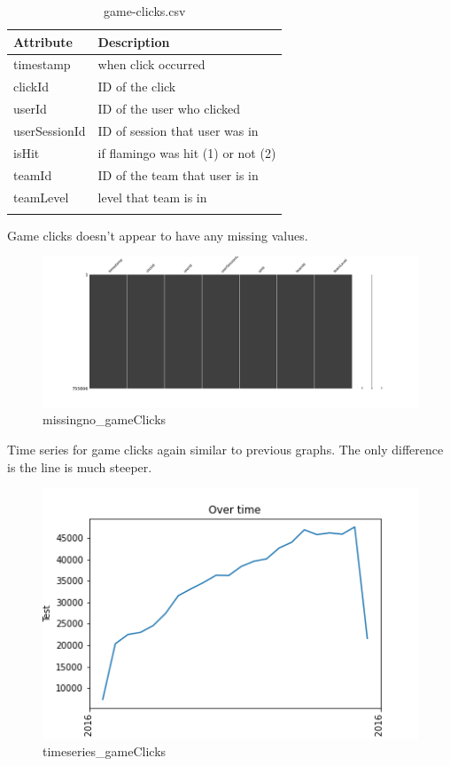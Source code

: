 \begin{center}
\begin{longtable}{ |l|l| } 
 \hline
 Attribute & Description\\ 
 \hline
 timestamp & when click occurred\\ 
 \hline
 clickId & ID of the click\\ 
 \hline
 userId & ID of the user who clicked\\ 
 \hline
 userSessionId & ID of session that user was in\\ 
 \hline
 isHit & if flamingo was hit (1) or not (2)\\ 
 \hline
 teamId & ID of the team that user is in\\ 
 \hline
 teamLevel & level that team is in\\ 
 \hline
\caption{game-clicks.csv}
\end{longtable}
\end{center}

Game clicks doesn't appear to have any missing values.
\begin{figure}[H]
\includegraphics[scale=0.25]{img/Graphs/gameClicks/missingno_gameClicks.png}
\centering
\caption{missingno\_gameClicks}
\label{fig:missingno_gameClicks}
\end{figure}

Time series for game clicks again similar to previous graphs. The only difference is the line is much steeper.
\begin{figure}[H]
\includegraphics[scale=0.85]{img/Graphs/gameClicks/timeseries_gameClicks.png}
\centering
\caption{timeseries\_gameClicks}
\label{fig:timeseries_gameClicks}
\end{figure}
